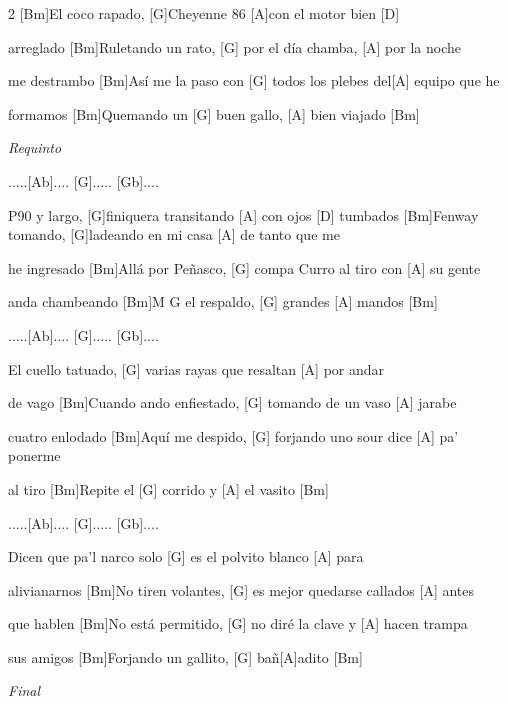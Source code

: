 \begin{guitar}
\begin{multicols}{2}
		[Bm]El coco rapado, [G]Cheyenne 86 [A]con el motor bien [D] \par arreglado
		[Bm]Ruletando un rato, [G] por el d\'ia chamba, [A] por la noche \par[D] me destrambo
		[Bm]As\'i me la paso con [G] todos los plebes del[A] equipo que he \par [D] formamos
		[Bm]Quemando un [G] buen gallo, [A] bien viajado [Bm] \par
		\par
		\textit{Requinto}
		\par
		[A].....[Ab].... [G]..... [Gb].... \par
		[Bm]P90 y largo, [G]finiquera transitando [A] con ojos [D] tumbados
		[Bm]Fenway tomando, [G]ladeando en mi casa [A] de tanto que me  \par [D] he ingresado
		[Bm]All\'a por Pe\~{n}asco, [G] compa Curro al tiro con [A] su gente  \par 
		[D]  anda chambeando
		[Bm]M G el respaldo, [G] grandes [A] mandos [Bm] \par
		\par
		[A].....[Ab].... [G]..... [Gb].... \par
		[Bm]El cuello tatuado, [G] varias rayas que resaltan [A] por andar \par [D] de vago
		[Bm]Cuando ando enfiestado, [G] tomando de un vaso [A] jarabe \par [D] cuatro enlodado
		[Bm]Aqu\'i me despido, [G] forjando uno sour dice [A] pa' ponerme \par [D] al tiro
		[Bm]Repite el [G] corrido y [A] el vasito [Bm] \par
		\par
		[A].....[Ab].... [G]..... [Gb].... \par
		[Bm]Dicen que pa'l narco solo [G] es el polvito blanco [A] para \par [D] alivianarnos
		[Bm]No tiren volantes, [G] es mejor quedarse callados [A] antes \par [D] que hablen
		[Bm]No est\'a permitido, [G] no dir\'e la clave y [A] hacen trampa \par [D] sus amigos
		[Bm]Forjando un gallito, [G] ba\~{n}[A]adito [Bm]

			\textit{Final}
	\end{multicols}
\end{guitar}
